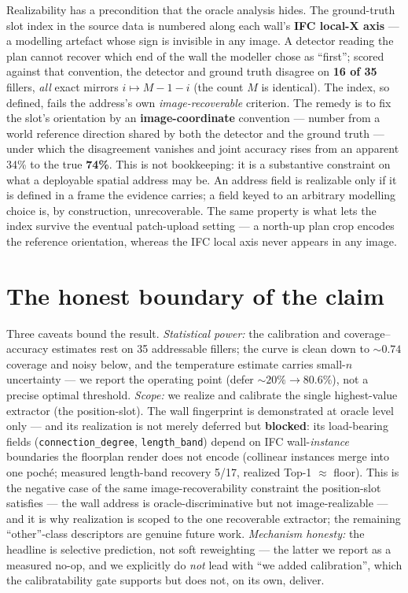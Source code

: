 Realizability has a precondition that the oracle analysis hides. The ground-truth slot index in the
source data is numbered along each wall's \textbf{IFC local-X axis} --- a modelling artefact whose
sign is invisible in any image. A detector reading the plan cannot recover which end of the wall the
modeller chose as ``first''; scored against that convention, the detector and ground truth disagree on
\textbf{16 of 35} fillers, \emph{all} exact mirrors $i \mapsto M-1-i$ (the count $M$ is identical).
The index, so defined, fails the address's own \emph{image-recoverable} criterion. The remedy is to
fix the slot's orientation by an \textbf{image-coordinate} convention --- number from a world
reference direction shared by both the detector and the ground truth --- under which the disagreement
vanishes and joint accuracy rises from an apparent 34\% to the true \textbf{74\%}. This is not
bookkeeping: it is a substantive constraint on what a deployable spatial address may be. An address
field is realizable only if it is defined in a frame the evidence carries; a field keyed to an
arbitrary modelling choice is, by construction, unrecoverable. The same property is what lets the
index survive the eventual patch-upload setting --- a north-up plan crop encodes the reference
orientation, whereas the IFC local axis never appears in any image.

\section{The honest boundary of the claim}

Three caveats bound the result. \emph{Statistical power:} the calibration and coverage--accuracy
estimates rest on 35 addressable fillers; the curve is clean down to ${\sim}0.74$ coverage and noisy
below, and the temperature estimate carries small-$n$ uncertainty --- we report the operating point
(defer ${\sim}20\% \to 80.6\%$), not a precise optimal threshold. \emph{Scope:} we realize and
calibrate the single highest-value extractor (the position-slot). The wall fingerprint is demonstrated
at oracle level only --- and its realization is not merely deferred but \textbf{blocked}: its
load-bearing fields (\texttt{connection\_degree}, \texttt{length\_band}) depend on IFC
wall-\emph{instance} boundaries the floorplan render does not encode (collinear instances merge into
one poch\'e; measured length-band recovery 5/17, realized Top-1 $\approx$ floor). This is the negative
case of the same image-recoverability constraint the position-slot satisfies --- the wall address is
oracle-discriminative but not image-realizable --- and it is why realization is scoped to the one
recoverable extractor; the remaining ``other''-class descriptors are genuine future work.
\emph{Mechanism honesty:} the headline is selective prediction, not soft reweighting --- the latter we
report as a measured no-op, and we explicitly do \emph{not} lead with ``we added calibration'', which
the calibratability gate supports but does not, on its own, deliver.

